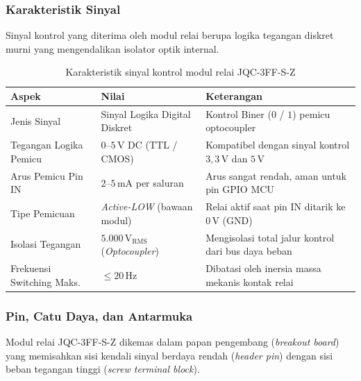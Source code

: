 \subsubsection{Karakteristik Sinyal}
Sinyal kontrol yang diterima oleh modul relai berupa logika tegangan diskret murni yang mengendalikan isolator optik internal.

\begin{table}[H]
	\centering
	\caption{Karakteristik sinyal kontrol modul relai JQC-3FF-S-Z}
	\label{tab:jqc3ff_sinyal}
	\small
	\begin{tabularx}{\textwidth}{@{} p{3.8cm} >{\hsize=0.8\hsize}X >{\hsize=1.2\hsize}X @{}}
		\toprule
		Aspek                     & Nilai                                                 & Keterangan                                                           \\
		\midrule
		Jenis Sinyal              & Sinyal Logika Digital Diskret                         & Kontrol Biner ($0$ / $1$) pemicu optocoupler                         \\
		Tegangan Logika Pemicu    & $0\text{--}5\,\text{V DC}$ (TTL / CMOS)               & Kompatibel dengan sinyal kontrol $3{,}3\,\text{V}$ dan $5\,\text{V}$ \\
		Arus Pemicu Pin IN        & $2\text{--}5\,\text{mA}$ per saluran                  & Arus sangat rendah, aman untuk pin GPIO MCU                          \\
		Tipe Pemicuan             & \textit{Active-LOW} (bawaan modul)                    & Relai aktif saat pin IN ditarik ke $0\,\text{V}$ (GND)               \\
		Isolasi Tegangan          & $5.000\,\text{V}_{\text{RMS}}$ (\textit{Optocoupler}) & Mengisolasi total jalur kontrol dari bus daya beban                  \\
		Frekuensi Switching Maks. & $\le 20\,\text{Hz}$                                   & Dibatasi oleh inersia massa mekanis kontak relai                     \\
		\bottomrule
	\end{tabularx}
\end{table}

\subsubsection{Pin, Catu Daya, dan Antarmuka}
Modul relai JQC-3FF-S-Z dikemas dalam papan pengembang (\textit{breakout board}) yang memisahkan sisi kendali sinyal berdaya rendah (\textit{header pin}) dengan sisi beban tegangan tinggi (\textit{screw terminal block}).

